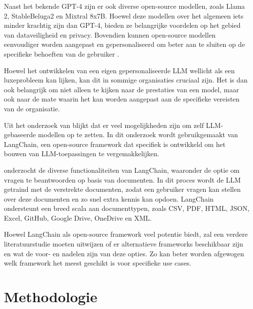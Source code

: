 Naast het bekende GPT-4 zijn er ook diverse open-source modellen, zoals Llama 2, StableBeluga2 en Mixtral 8x7B. Hoewel deze modellen over het algemeen iets minder krachtig zijn dan GPT-4, bieden ze belangrijke voordelen op het gebied van dataveiligheid en privacy. Bovendien kunnen open-source modellen eenvoudiger worden aangepast en gepersonaliseerd om beter aan te sluiten op de specifieke behoeften van de gebruiker \autocite{KernanFreire2024}.

Hoewel het ontwikkelen van een eigen gepersonaliseerde LLM wellicht als een luxeprobleem kan lijken, kan dit in sommige organisaties cruciaal zijn. Het is dan ook belangrijk om niet alleen te kijken naar de prestaties van een model, maar ook naar de mate waarin het kan worden aangepast aan de specifieke vereisten van de organisatie.

Uit het onderzoek van \textcite{Topsakal2023} blijkt dat er veel mogelijkheden zijn om zelf LLM-gebaseerde modellen op te zetten. In dit onderzoek wordt gebruikgemaakt van LangChain, een open-source framework dat specifiek is ontwikkeld om het bouwen van LLM-toepassingen te vergemakkelijken.

\textcite{Topsakal2023} onderzocht de diverse functionaliteiten van LangChain, waaronder de optie om vragen te beantwoorden op basis van documenten. In dit proces wordt de LLM getraind met de verstrekte documenten, zodat een gebruiker vragen kan stellen over deze documenten en zo snel extra kennis kan opdoen. LangChain ondersteunt een breed scala aan documenttypen, zoals CSV, PDF, HTML, JSON, Excel, GitHub, Google Drive, OneDrive en XML.

Hoewel LangChain als open-source framework veel potentie biedt, zal een verdere literatuurstudie moeten uitwijzen of er alternatieve frameworks beschikbaar zijn en wat de voor- en nadelen zijn van deze opties. Zo kan beter worden afgewogen welk framework het meest geschikt is voor specifieke use cases.


\section{Methodologie}%
\label{sec:methodologie}


